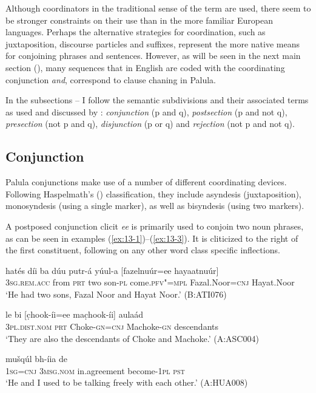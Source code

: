 Although coordinators in the traditional sense of the term are used, there seem to be stronger constraints on their use than in the more familiar European languages. Perhaps the alternative strategies for coordination, such as juxtaposition, discourse particles and suffixes, represent the more native means for conjoining phrases and sentences. However, as will be seen in the next main section (), many sequences that in English are coded with the coordinating conjunction \textit{and}, correspond to clause chaning in Palula.



In the subsections -- I follow the semantic subdivisions and their associated terms as used and discussed by \citet{payne1985}: \textit{conjunction} (p and q), \textit{postsection} (p and not q), \textit{presection} (not p and q), \textit{disjunction} (p or q) and \textit{rejection} (not p and not q).


\subsection{Conjunction}
\label{subsec:13-2-1}

Palula conjunctions make use of a number of different coordinating devices. Following Haspelmath's (\citeyear{haspelmath2007}) classification, they include asyndesis (juxtaposition), monosyndesis (using a single marker), as well as bisyndesis (using two markers).

 A postposed conjunction clicit \textit{ee} is primarily used to conjoin two noun phrases, as can be seen in examples (\ref{ex:13-1})--(\ref{ex:13-3}). It is cliticized to the right of the first constituent, following on any other word class specific inflections.

\begin{exe}
\ex
\label{ex:13-1}
\gll hatés díi ba dúu putr-á yúul-a [fazelnuúr=ee hayaatnuúr] \\
\textsc{3sg.rem.acc} from \textsc{prt} two son-\textsc{pl} come.\textsc{pfv"=mpl} Fazal.Noor=\textsc{cnj} Hayat.Noor\\
\glt `He had two sons, Fazal Noor and Hayat Noor.' (B:ATI076) 

\ex
\label{ex:13-2}
\gll le bi [c̣hook-íi=ee mac̣hook-íi] aulaád \\
\textsc{3pl.dist.nom} \textsc{prt} Choke-\textsc{gn=cnj} Machoke-\textsc{gn} descendants\\
\glt `They are also the descendants of Choke and Machoke.' (A:ASC004)

\ex
\label{ex:13-3}
\gll [máa=ee so] mušqúl bh-íia de  \\
\textsc{1sg}=\textsc{cnj} \textsc{3msg.nom} in.agreement become-\textsc{1pl} \textsc{pst} \\
\glt `He and I used to be talking freely with each other.' (A:HUA008) 
\end{exe}

